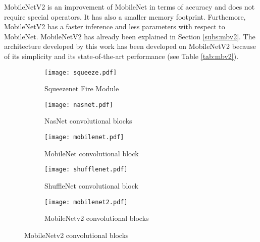 MobileNetV2 \cite{sandler_mobilenetv2_2019} is an improvement of MobileNet in terms of accuracy and does not require special operators. It has also a smaller memory footprint. Furthemore, MobileNetV2 has a faster inference and less parameters with respect to MobileNet. MobileNetV2 has already been explained in Section \ref{subs:mbv2}. The architecture developed by this work has been developed on MobileNetV2 because of its simplicity and its state-of-the-art performance (see Table \ref{tab:mbv2}).
%
\begin{figure}
    \centering
    \begin{subfigure}{0.49\linewidth}
        \centering
        \texttt{[image: squeeze.pdf]}
        \caption{Squeezenet Fire Module\cite{iandola_squeezenet_2016}}
        \label{fig:archi_building_block:sqn}
    \end{subfigure}
    \begin{subfigure}{0.49\linewidth}
        \centering
        \texttt{[image: nasnet.pdf]}
        \caption{NasNet convolutional blocks \cite{zoph_learning_2018}}
        \label{fig:archi_building_block:nasn}
    \end{subfigure}
    \begin{subfigure}{0.49\linewidth}
        \centering
        \texttt{[image: mobilenet.pdf]}
        \caption{MobileNet convolutional block \cite{howard_mobilenets_2017}}
        \label{fig:archi_building_block:mbn}
    \end{subfigure}
    \begin{subfigure}{0.49\linewidth}
        \centering
        \texttt{[image: shufflenet.pdf]}
        \caption{ShuffleNet convolutional block \cite{zhang_shufflenet_2018}}
        \label{fig:archi_building_block:shn}
    \end{subfigure}
    \begin{subfigure}{0.49\linewidth}
        \centering
        \texttt{[image: mobilenet2.pdf]}
        \caption{MobileNetv2 convolutional blocks \cite{sandler_mobilenetv2_2019}}
        \label{fig:archi_building_block:mb2n}
    \end{subfigure}
    \label{fig:archi_building_block}
\end{figure}

